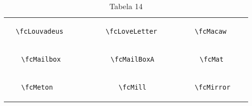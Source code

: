 \documentclass[x11names]{article}
\begin{document}
\begin{table}[H]
\begin{tabular}{|c|c|c|c|c|c|}
		&\multirow{5}{*}{	\fcLouvadeus	[scale=0.4]} & &\multirow{5}{*}{	\fcLoveLetter	[scale=0.4]} & &\multirow{5}{*}{	\fcMacaw	[scale=0.4]}\\	& & & & & \\	& & & & & \\	\verb|	\fcLouvadeus	| & & \verb|	\fcLoveLetter	| & & \verb|	\fcMacaw	| & \\	& & & & & \\	& & & & & \\	& & & & & \\	\hline									
		&\multirow{5}{*}{	\fcMailbox	[scale=0.8]} & &\multirow{5}{*}{	\fcMailBoxA	[scale=0.4]} & &\multirow{5}{*}{	\fcMat	[scale=0.4]}\\	& & & & & \\	& & & & & \\	\verb|	\fcMailbox	| & & \verb|	\fcMailBoxA	| & & \verb|	\fcMat	| & \\	& & & & & \\	& & & & & \\	& & & & & \\	\hline									
		&\multirow{5}{*}{	\fcMeton	[scale=0.4]} & &\multirow{5}{*}{	\fcMill	[scale=0.4]} & &\multirow{5}{*}{	\fcMirror	[scale=0.4]}\\	& & & & & \\	& & & & & \\	\verb|	\fcMeton	| & & \verb|	\fcMill	| & & \verb|	\fcMirror	| & \\	& & & & & \\	& & & & & \\	& & & & & \\		\hline 	\hline 	\end{tabular}	\caption{	Tabela 14	}\label{	Tab14	}\end{table}
\end{document}
